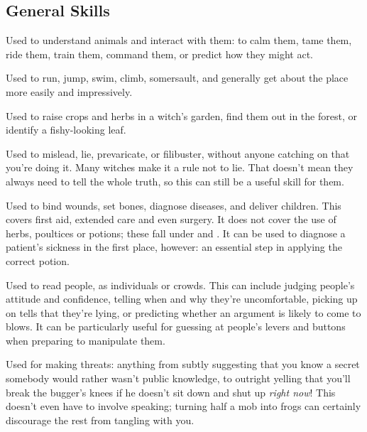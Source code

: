 \subsection{General Skills}


Used to understand animals and interact with them: to calm them, tame them, ride them, train them, command them, or predict how they might act.


Used to run, jump, swim, climb, somersault, and generally get about the place more easily and impressively.


Used to raise crops and herbs in a witch's garden, find them out in the forest, or identify a fishy-looking leaf.


Used to mislead, lie, prevaricate, or filibuster, without anyone catching on that you're doing it.
Many witches make it a rule not to lie.
That doesn't mean they always need to tell the whole truth, so this can still be a useful skill for them.


Used to bind wounds, set bones, diagnose diseases, and deliver children.
This covers first aid, extended care and even surgery.
It does not cover the use of herbs, poultices or potions; these fall under  and .
It can be used to diagnose a patient's sickness in the first place, however: an essential step in applying the correct potion.


Used to read people, as individuals or crowds.
This can include judging people's attitude and confidence, telling when and why they're uncomfortable, picking up on tells that they're lying, or predicting whether an argument is likely to come to blows.
It can be particularly useful for guessing at people's levers and buttons when preparing to manipulate them.


Used for making threats: anything from subtly suggesting that you know a secret somebody would rather wasn't public knowledge, to outright yelling that you'll break the bugger's knees if he doesn't sit down and shut up \emph{right now}!
This doesn't even have to involve speaking; turning half a mob into frogs can certainly discourage the rest from tangling with you.

